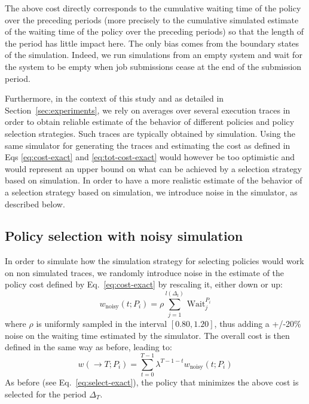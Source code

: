 \documentclass[sigconf,anonymous]{acmart}
\begin{document}
The above cost directly corresponds to the cumulative waiting time of the
policy over the preceding periods (more precisely to the cumulative simulated
estimate of the waiting time of the policy over the preceding periods) so that
the length of the period has little impact here. The only bias comes from the
boundary states of the simulation. Indeed, we run simulations from an empty
system and wait for the system to be empty when job submissions cease at the
end of the submission period.

Furthermore, in the context of this study and as detailed in
Section~\ref{sec:experiments}, we rely on averages over several execution
traces in order to obtain reliable estimate of the behavior of different
policies and policy selection strategies. Such traces are typically obtained by
simulation. Using the same simulator for generating the traces and estimating
the cost as defined in Eqs \ref{eq:cost-exact} and \ref{eq:tot-cost-exact}
would however be too optimistic and would represent an upper bound on what can
be achieved by a selection strategy based on simulation. In order to have a
more realistic estimate of the behavior of a selection strategy based on
simulation, we introduce noise in the simulator, as described below.

\subsection{Policy selection with noisy simulation}
\label{sub:noisy}

In order to simulate how the simulation strategy for selecting policies would
work on non simulated traces, we randomly introduce noise in the estimate of
the policy cost defined by Eq.~\ref{eq:cost-exact} by rescaling it, either
down or up:
%
\begin{equation} \label{eq:cost-noisy} w_{\mbox{noisy}}(t;P_i) =
 \rho \sum_{j=1}^{l(\Delta_t)} \, \mbox{Wait}_j^{P_i} \end{equation}
%
where $\rho$ is uniformly sampled in the interval $[0.80,1.20]$, thus adding a
+/-20\% noise on the waiting time estimated by the simulator. The overall cost
is then defined in the same way as before, leading to:
%
\begin{equation} \label{eq:tot-cost-noisy} w(\rightarrow T;P_i) =
\sum_{t=0}^{T-1} \lambda^{T-1-t} w_{\mbox{noisy}}(t;P_i) \end{equation}
%
As before (see Eq.~\ref{eq:select-exact}), the policy that minimizes the above
cost is selected for the period $\Delta_T$.
\end{document}

